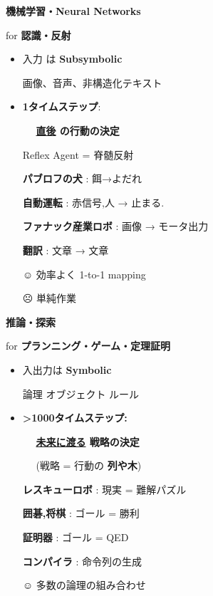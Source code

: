 \begin{container-fluid}
\begin{row-fluid}
\begin{span6}
\textbf{機械学習・Neural Networks} 

for \textbf{認識・反射}
\begin{itemize}
\item 入力 は \textbf{Subsymbolic}

画像、音声、非構造化テキスト
\item \textbf{1タイムステップ}:

　 \textbf{\uline{直後} の行動の決定}
\begin{smaller}
Reflex Agent = 脊髄反射

\textbf{パブロフの犬} : 餌→よだれ

\textbf{自動運転} : 赤信号,人 → 止まる.

\textbf{ファナック産業ロボ} : 画像 → モータ出力

\textbf{翻訳} : 文章 → 文章
\end{smaller}
☺ 効率よく 1-to-1 mapping

☹ 単純作業
\end{itemize}
\end{span6}
\begin{span6}
\textbf{推論・探索}

for \textbf{プランニング・ゲーム・定理証明}
\begin{itemize}
\item 入出力は \textbf{Symbolic}

論理 オブジェクト ルール
\item \textbf{>1000タイムステップ:}

　 \textbf{\uline{未来に渡る} 戦略の決定}

　 (戦略 = 行動の \textbf{列や木})
\begin{smaller}
\textbf{レスキューロボ} : 現実 = 難解パズル

\textbf{囲碁,将棋} : ゴール = 勝利

\textbf{証明器} : ゴール = QED

\textbf{コンパイラ} : 命令列の生成
\end{smaller}
\begin{larger}
☺ 多数の論理の組み合わせ
\end{larger}
\end{itemize}
\end{span6}
\end{row-fluid}
\end{container-fluid}

